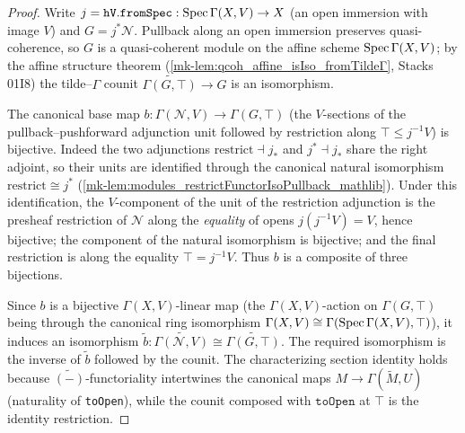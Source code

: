 \begin{proof}
  \leanok
  Write \(j = \mathtt{hV.fromSpec} : \operatorname{Spec}\Gamma(X,V) \to X\) (an open
  immersion with image \(V\)) and \(G = j^{*}\mathcal N\). Pullback along an
  open immersion preserves quasi-coherence, so \(G\) is a
  quasi-coherent module on the affine scheme \(\operatorname{Spec}\Gamma(X,V)\); by the
  affine structure theorem (\ref{mk-lem:qcoh_affine_isIso_fromTildeΓ},
  Stacks 01I8) the tilde--\(\Gamma\)
  counit \(\widetilde{\Gamma(G,\top)} \to G\) is an isomorphism.

  The canonical base map \(b : \Gamma(\mathcal N, V) \to \Gamma(G, \top)\)
  (the \(V\)-sections of the pullback--pushforward adjunction unit followed by
  restriction along \(\top \le j^{-1}V\)) is bijective. Indeed the two
  adjunctions \(\mathrm{restrict} \dashv j_{*}\) and \(j^{*} \dashv j_{*}\)
  share the right adjoint, so their units are identified through the canonical
  natural isomorphism \(\mathrm{restrict} \cong j^{*}\)
  (\ref{mk-lem:modules_restrictFunctorIsoPullback_mathlib}). Under this
  identification, the \(V\)-component of the unit of the restriction
  adjunction is the presheaf restriction of \(\mathcal N\) along the
  \emph{equality} of opens \(j(j^{-1}V) = V\), hence bijective; the component
  of the natural isomorphism is bijective; and the final restriction is along
  the equality \(\top = j^{-1}V\). Thus \(b\) is a composite of three
  bijections.

  Since \(b\) is a bijective \(\Gamma(X,V)\)-linear map (the
  \(\Gamma(X,V)\)-action on \(\Gamma(G,\top)\) being through the canonical
  ring isomorphism \(\Gamma(X,V) \cong \Gamma(\operatorname{Spec}\Gamma(X,V),\top)\)),
  it induces an isomorphism
  \(\widetilde{b} : \widetilde{\Gamma(\mathcal N,V)} \cong
  \widetilde{\Gamma(G,\top)}\). The required isomorphism is the inverse of
  \(\widetilde{b}\) followed by the counit. The characterizing section
  identity holds because \(\widetilde{(-)}\)-functoriality intertwines the
  canonical maps \(M \to \Gamma(\widetilde M, U)\) (naturality of
  \texttt{toOpen}), while the counit composed with \(\mathtt{toOpen}\) at
  \(\top\) is the identity restriction.
\end{proof}

